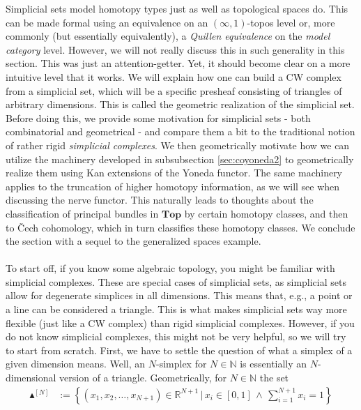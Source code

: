 Simplicial sets model homotopy types just as well as topological spaces do.
This can be made formal using an equivalence on an $(\infty,1)$-topos level or, more commonly (but essentially equivalently), a \textit{Quillen equivalence} on the \textit{model category} level.
However, we will not really discuss this in such generality in this section.
This was just an attention-getter.
Yet, it should become clear on a more intuitive level that it works.
We will explain how one can build a CW complex from a simplicial set, which will be a specific presheaf consisting of {\glqq}triangles of arbitrary dimensions{\grqq}.
This is called the geometric realization of the simplicial set.
Before doing this, we provide some motivation for simplicial sets - both combinatorial and geometrical - and compare them a bit to the traditional notion of rather rigid \textit{simplicial complexes}.
We then geometrically motivate how we can utilize the machinery developed in subsubsection \ref{sec:coyoneda2} to geometrically realize them using Kan extensions of the Yoneda functor.
The same machinery applies to the truncation of higher homotopy information, as we will see when discussing the nerve functor.
This naturally leads to thoughts about the classification of principal bundles in $\mathbf{Top}$ by certain homotopy classes, and then to \v{C}ech cohomology, which in turn classifies these homotopy classes.
We conclude the section with a sequel to the generalized spaces example.
\\\\
To start off, if you know some algebraic topology, you might be familiar with simplicial complexes.
These are special cases of simplicial sets, as simplicial sets allow for degenerate simplices in all dimensions.
This means that, e.g., a point or a line can be considered a triangle.
This is what makes simplicial sets way more flexible (just like a CW complex) than rigid simplicial complexes.
However, if you do not know simplicial complexes, this might not be very helpful, so we will try to start from scratch.
First, we have to settle the question of what a simplex of a given dimension means.
Well, an $N$-simplex for $N \in \mathbb{N}$ is essentially an $N$-dimensional version of a triangle.
Geometrically, for $N \in \mathbb{N}$ the set
\begin{align*}
  \blacktriangle^{[N]}
  &:=
  \left\lbrace
      (x_{1},x_{2},\ldots,x_{N+1})
      \in
      \mathbb{R}^{N+1}
    \,
    \vert
    \,
      x_{i}
      \in
      [0,1]
      \,
      \land
      \,
      \sum_{i=1}^{N+1}
      x_{i}
      =
      1
  \right\rbrace
\end{align*}
